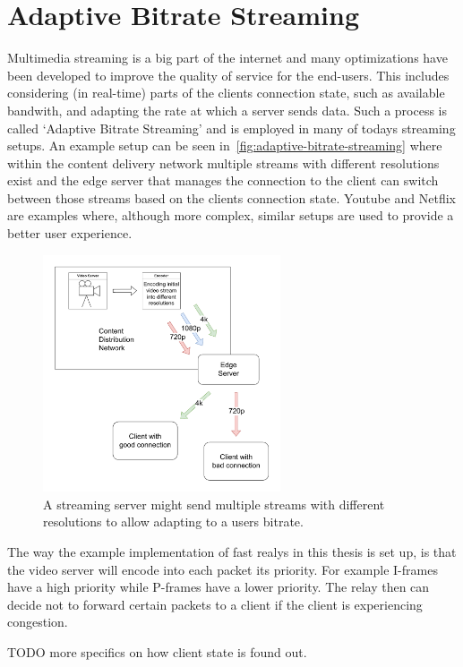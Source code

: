 \section{Adaptive Bitrate Streaming}\label{sec:adaptive_bitrate_streaming}
Multimedia streaming is a big part of the internet and many optimizations have
been developed to improve the quality of service for the end-users.
This includes considering (in real-time) parts of the clients connection state, 
such as available bandwith, and adapting the rate at which a server sends data.
Such a process is called `Adaptive Bitrate Streaming' and is employed in many 
of todays streaming setups.
An example setup can be seen in~\autoref{fig:adaptive-bitrate-streaming} where
within the content delivery network multiple streams with different resolutions
exist and the edge server that manages the connection to the client can switch
between those streams based on the clients connection state.
Youtube and Netflix are examples where, although more complex, similar setups
are used to provide a better user experience. 

\begin{figure}[htbp]
    \centering
    \includegraphics[width=7cm]{figures/02_background/adaptive-bitrate-streaming.drawio.pdf}
    \caption{A streaming server might send multiple streams with different
    resolutions to allow adapting to a users bitrate.}\label{fig:adaptive-bitrate-streaming}
\end{figure}

The way the example implementation of fast realys in this thesis is set up,
is that the video server will encode into each packet its priority.
For example I-frames have a high priority while P-frames have a lower
priority.
The relay then can decide not to forward certain packets to a client if
the client is experiencing congestion.

TODO more specifics on how client state is found out.